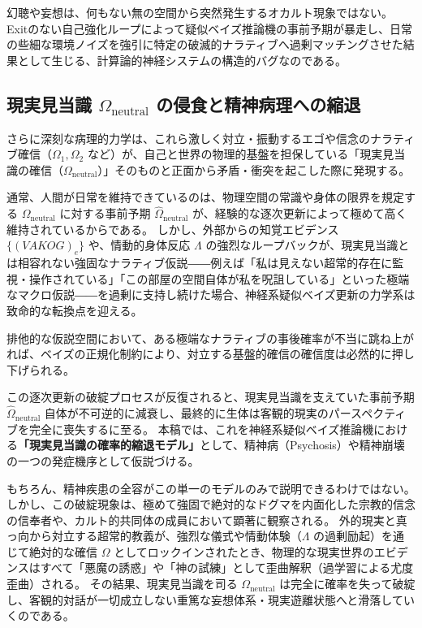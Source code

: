 幻聴や妄想は、何もない無の空間から突然発生するオカルト現象ではない。
Exitのない自己強化ループによって疑似ベイズ推論機の事前予期が暴走し、日常の些細な環境ノイズを強引に特定の破滅的ナラティブへ過剰マッチングさせた結果として生じる、計算論的神経システムの構造的バグなのである。


\subsection{現実見当識 $\Omega_{\mathrm{neutral}}$ の侵食と精神病理への縮退}

さらに深刻な病理的力学は、これら激しく対立・振動するエゴや信念のナラティブ確信（$\Omega_1, \Omega_2$ など）が、自己と世界の物理的基盤を担保している「現実見当識の確信（$\Omega_{\mathrm{neutral}}$）」そのものと正面から矛盾・衝突を起こした際に発現する。

通常、人間が日常を維持できているのは、物理空間の常識や身体の限界を規定する $\Omega_{\mathrm{neutral}}$ に対する事前予期 $\hat{\Omega}_{\mathrm{neutral}}$ が、経験的な逐次更新によって極めて高く維持されているからである。
しかし、外部からの知覚エビデンス $\{(VAKOG)_e\}$ や、情動的身体反応 $\Lambda$ の強烈なループバックが、現実見当識とは相容れない強固なナラティブ仮説――例えば「私は見えない超常的存在に監視・操作されている」「この部屋の空間自体が私を呪詛している」といった極端なマクロ仮説――を過剰に支持し続けた場合、神経系疑似ベイズ更新の力学系は致命的な転換点を迎える。

排他的な仮説空間において、ある極端なナラティブの事後確率が不当に跳ね上がれば、ベイズの正規化制約により、対立する基盤的確信の確信度は必然的に押し下げられる。

この逐次更新の破綻プロセスが反復されると、現実見当識を支えていた事前予期 $\hat{\Omega}_{\mathrm{neutral}}$ 自体が不可逆的に減衰し、最終的に生体は客観的現実のパースペクティブを完全に喪失するに至る。
本稿では、これを神経系疑似ベイズ推論機における\textbf{「現実見当識の確率的縮退モデル」}として、精神病（Psychosis）や精神崩壊の一つの発症機序として仮説づける。

もちろん、精神疾患の全容がこの単一のモデルのみで説明できるわけではない。
しかし、この破綻現象は、極めて強固で絶対的なドグマを内面化した宗教的信念の信奉者や、カルト的共同体の成員において顕著に観察される。
外的現実と真っ向から対立する超常的教義が、強烈な儀式や情動体験（$\Lambda$ の過剰励起）を通じて絶対的な確信 $\Omega$ としてロックインされたとき、物理的な現実世界のエビデンスはすべて「悪魔の誘惑」や「神の試練」として歪曲解釈（過学習による尤度歪曲）される。
その結果、現実見当識を司る $\Omega_{\mathrm{neutral}}$ は完全に確率を失って破綻し、客観的対話が一切成立しない重篤な妄想体系・現実遊離状態へと滑落していくのである。


